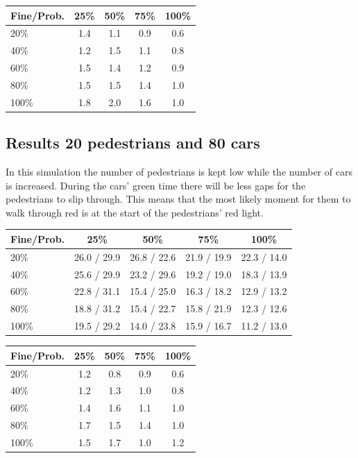 \documentclass[a4paper]{article}
\begin{document}
\begin{table}[H]
\centering
\begin{tabular}{ l | c c c c }
  Fine\slash Prob. & 25\% & 50\% & 75\% & 100\% \\ 
  \hline
  20\%  & 1.4 & 1.1 & 0.9 & 0.6  \\
  40\%  & 1.2 & 1.5 & 1.1 & 0.8  \\
  60\%  & 1.5 & 1.4 & 1.2 & 0.9  \\
  80\%  & 1.5 & 1.5 & 1.4 & 1.0  \\
  100\% & 1.8 & 2.0 & 1.6 & 1.0  \\
\end{tabular}
\end{table}

\clearpage
\subsection{Results 20 pedestrians and 80 cars}
In this simulation the number of pedestrians is kept low while the number of cars is increased. During the cars' green time there will be less gaps for the pedestrians to slip through. This means that the most likely moment for them to walk through red is at the start of the pedestrians' red light.

\begin{table}[H]
\centering
\begin{tabular}{ l | c c c c }
  Fine\slash Prob. & 25\% & 50\% & 75\% & 100\% \\ 
  \hline
  20\%  & 26.0 / 29.9 & 26.8 / 22.6 & 21.9 / 19.9 & 22.3 / 14.0  \\
  40\%  & 25.6 / 29.9 & 23.2 / 29.6 & 19.2 / 19.0 & 18.3 / 13.9  \\
  60\%  & 22.8 / 31.1 & 15.4 / 25.0 & 16.3 / 18.2 & 12.9 / 13.2  \\
  80\%  & 18.8 / 31.2 & 15.4 / 22.7 & 15.8 / 21.9 & 12.3 / 12.6  \\
  100\% & 19.5 / 29.2 & 14.0 / 23.8 & 15.9 / 16.7 & 11.2 / 13.0  \\
\end{tabular}
\end{table}

\begin{table}[H]
\centering
\begin{tabular}{ l | c c c c }
  Fine\slash Prob. & 25\% & 50\% & 75\% & 100\% \\ 
  \hline
  20\%  & 1.2 & 0.8 & 0.9 & 0.6  \\
  40\%  & 1.2 & 1.3 & 1.0 & 0.8  \\
  60\%  & 1.4 & 1.6 & 1.1 & 1.0  \\
  80\%  & 1.7 & 1.5 & 1.4 & 1.0  \\
  100\% & 1.5 & 1.7 & 1.0 & 1.2  \\
\end{tabular}
\end{table}
\end{document}
